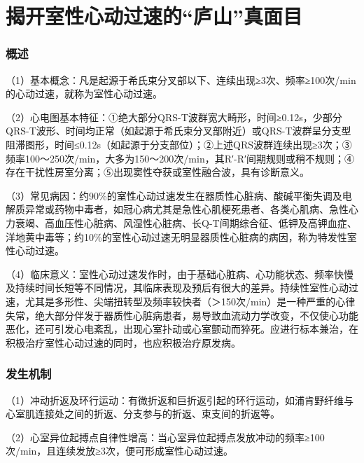 \protect\hypertarget{text00040.htmlux5cux23chapter40}{}{}

\chapter{揭开室性心动过速的“庐山”真面目}

\protect\hypertarget{text00040.htmlux5cux23subid442}{}{}

\subsection{概述}

（1）基本概念：凡是起源于希氏束分叉部以下、连续出现≥3次、频率≥100次/min的心动过速，就称为室性心动过速。

（2）心电图基本特征：①绝大部分QRS-T波群宽大畸形，时间≥0.12s，少部分QRS-T波形、时间均正常（如起源于希氏束分叉部附近）或QRS-T波群呈分支型阻滞图形，时间≤0.12s（如起源于分支部位）；②上述QRS波群连续出现≥3次；③频率100～250次/min，大多为150～200次/min，其R′-R′间期规则或稍不规则；④存在干扰性房室分离；⑤出现窦性夺获或室性融合波，具有诊断意义。

（3）常见病因：约90\%的室性心动过速发生在器质性心脏病、酸碱平衡失调及电解质异常或药物中毒者，如冠心病尤其是急性心肌梗死患者、各类心肌病、急性心力衰竭、高血压性心脏病、风湿性心脏病、长Q-T间期综合征、低钾及高钾血症、洋地黄中毒等；约10\%的室性心动过速无明显器质性心脏病的病因，称为特发性室性心动过速。

（4）临床意义：室性心动过速发作时，由于基础心脏病、心功能状态、频率快慢及持续时间长短等不同情况，其临床表现及预后有很大的差异。持续性室性心动过速，尤其是多形性、尖端扭转型及频率较快者（＞150次/min）是一种严重的心律失常，绝大部分伴发于器质性心脏病患者，易导致血流动力学改变，不仅使心功能恶化，还可引发心电紊乱，出现心室扑动或心室颤动而猝死。应进行标本兼治，在积极治疗室性心动过速的同时，也应积极治疗原发病。

\protect\hypertarget{text00040.htmlux5cux23subid443}{}{}

\subsection{发生机制}

（1）冲动折返及环行运动：有微折返和巨折返引起的环行运动，如浦肯野纤维与心室肌连接处之间的折返、分支参与的折返、束支间的折返等。

（2）心室异位起搏点自律性增高：当心室异位起搏点发放冲动的频率≥100次/min，且连续发放≥3次，便可形成室性心动过速。

